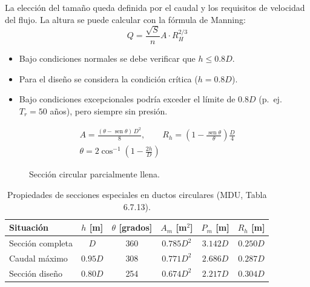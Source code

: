 La elección del tamaño queda definida por el caudal y los requisitos de
velocidad del flujo. La altura se puede calcular con la fórmula de Manning:
\[
Q=\frac{\sqrt S}{n}A\cdot R_H^{2/3}
\]
\begin{itemize}
  \item Bajo condiciones normales se debe verificar que $h\leq0.8D$.
  \item Para el diseño se considera la condición crítica ($h=0.8D$).
  \item Bajo condiciones excepcionales podría exceder el límite de $0.8D$
        (p.~ej.\ $T_r=50$ años), pero siempre sin presión.
\end{itemize}

\begin{figure}[H]
\centering
\begin{minipage}{0.35\textwidth}\centering
{}
\end{minipage}
\begin{minipage}{0.55\textwidth}
\[
\begin{gathered}
A=\frac{(\theta-\operatorname{sen}\theta)\,D^2}{8},\qquad
R_h=\left(1-\frac{\operatorname{sen}\theta}{\theta}\right)\frac D4\\
\theta=2\cos^{-1}\left(1-\frac{2h}{D}\right)
\end{gathered}
\]
\end{minipage}
\caption{Sección circular parcialmente llena.}
\end{figure}

\begin{table}[H]
\centering
\begin{tabular}{lccccc}
\toprule
\textbf{Situación} & $h$ [m] & $\theta$ [grados] & $A_m$ [m$^2$] & $P_m$ [m] & $R_h$ [m]\\
\midrule
Sección completa & $D$ & 360 & $0.785D^2$ & $3.142D$ & $0.250D$\\
Caudal máximo & $0.95D$ & 308 & $0.771D^2$ & $2.686D$ & $0.287D$\\
Sección diseño & $0.80D$ & 254 & $0.674D^2$ & $2.217D$ & $0.304D$\\
\bottomrule
\end{tabular}
\caption{Propiedades de secciones especiales en ductos circulares (MDU, Tabla 6.7.13).}
\end{table}

